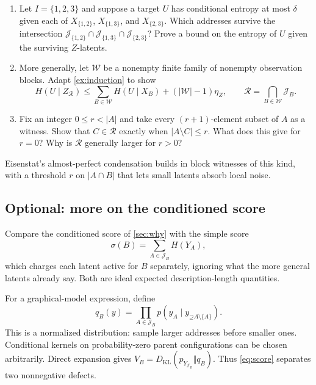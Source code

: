 \documentclass[11pt]{article}
\newcommand{\Up}{\mathord{\supseteq}}
\begin{document}
\begin{exercise}
\label{ex:blocks}
\begin{enumerate}
\item Let $I=\{1,2,3\}$ and suppose a target $U$ has conditional entropy at
most $\delta$ given each of $X_{\{1,2\}}$, $X_{\{1,3\}}$, and
$X_{\{2,3\}}$. Which addresses survive the intersection
$\mathcal{J}_{\{1,2\}}\cap\mathcal{J}_{\{1,3\}}\cap\mathcal{J}_{\{2,3\}}$?
Prove a bound on the entropy of $U$ given the surviving $Z$-latents.
\item More generally, let $\mathcal{W}$ be a nonempty finite family of nonempty
observation blocks. Adapt \cref{ex:induction} to show
\[
 H(U\mid Z_{\mathcal{R}})\le
 \sum_{B\in\mathcal{W}}H(U\mid X_B)+(|\mathcal{W}|-1)\eta_Z,
 \qquad \mathcal{R}=\bigcap_{B\in\mathcal{W}}\mathcal{J}_B.
\]
\item Fix an integer $0\le r<|A|$ and take every $(r+1)$-element subset of $A$ as a
witness. Show that $C\in\mathcal{R}$ exactly when $|A\setminus C|\le r$.
What does this give for $r=0$? Why is $\mathcal{R}$ generally larger for $r>0$?
\end{enumerate}
\end{exercise}

Eisenstat's almost-perfect condensation \citep{eisenstat2025condensation}
builds in block witnesses of this kind, with a threshold $r$ on $|A\cap B|$
that lets small latents absorb local noise.

\subsection{Optional: more on the conditioned score}
\label{sec:scores}
Compare the conditioned score of \cref{sec:why} with the simple score
\[
 \sigma(B)=\sum_{A\in\mathcal{J}_B}H(Y_A),
\]
which charges each latent active for $B$ separately, ignoring what the more
general latents already say. Both are ideal expected description-length
quantities.

For a graphical-model expression, define
\[
 q_B(y)=\prod_{A\in\mathcal{J}_B}
 p(y_A\mid y_{\Up A\setminus\{A\}}).
\]
This is a normalized distribution: sample larger addresses before smaller
ones. Conditional kernels on probability-zero parent configurations can be
chosen arbitrarily. Direct expansion gives
$V_B=D_{\mathrm{KL}}(p_{Y_{\mathcal{J}_B}}\Vert q_B)$.
Thus \eqref{eq:score} separates two nonnegative defects.
\end{document}

